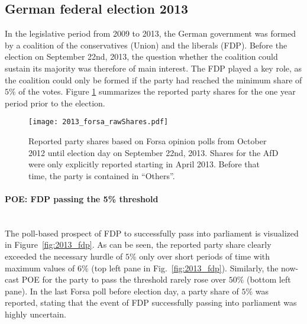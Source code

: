 \documentclass[smallextended]{svjour3}      %
\begin{document}
\subsection{German federal election 2013} \label{subsec:2013}
In the legislative period from 2009 to 2013, the German government was formed by
a coalition of the conservatives (Union) and the liberals (FDP). Before the
election on September 22nd, 2013, the question whether the coalition could
sustain its majority was therefore of main interest. The FDP played a key role,
as the coalition could only be formed if the party had reached the minimum share
of $5\%$ of the votes. Figure \ref{fig:2013} summarizes the reported party shares
for the one year period prior to the election.

\begin{figure}[H]\centering
\texttt{[image: 2013\_forsa\_rawShares.pdf]}
\caption{Reported party shares based on Forsa opinion polls
from October 2012 until election day on September 22nd, 2013.
Shares for the AfD were only explicitly reported starting in April 2013.
Before that time, the party is contained in ``Others''.
\label{fig:2013}
}
\end{figure}


\paragraph{POE: FDP passing the 5\% threshold} \ \\

The poll-based prospect of FDP to successfully pass into parliament is visualized
in Figure~\ref{fig:2013_fdp}.
As can be seen, the reported party share clearly exceeded the necessary hurdle
of $5\%$ only over short periods of time with maximum values
of $6\%$ (top left pane in Fig.~\ref{fig:2013_fdp}). Similarly, the now-cast POE
for the party to pass the threshold rarely rose over $50\%$ (bottom left pane).
In the last Forsa poll before election day, a party share of $5\%$ was reported,
stating that the event of FDP successfully passing into parliament was highly uncertain.\\
\end{document}
